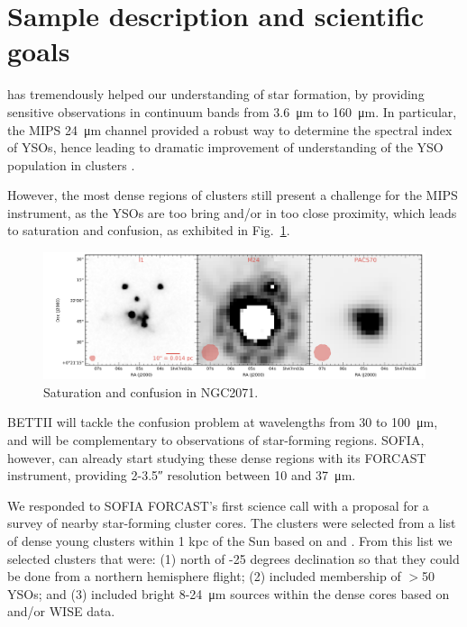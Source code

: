 \section{Sample description and scientific goals}

\Spitzer has tremendously helped our understanding of star formation, by providing sensitive observations in continuum bands from \SI{3.6}{\um} to \SI{160}{\micro\meter}. In particular, the MIPS \SI{24}{\micro\meter} channel provided a robust way to determine the spectral index of YSOs, hence leading to dramatic improvement of understanding of the YSO population in clusters \citep[e.g.,][]{Gutermuth:2009gca,Gutermuth:2011he}.

However, the most dense regions of clusters still present a challenge for the MIPS instrument, as the YSOs are too bring and/or in too close proximity, which leads to saturation and confusion, as exhibited in Fig.~\ref{fig:NGC2071saturated}. 

\begin{figure}[!h]
\begin{center}
\includegraphics[width=\textwidth]{Figures/NGC2071_saturated_mosaic.png}
\vspace{-0.5cm}
\caption[Saturation and confusion]{Saturation and confusion in NGC2071.}
\label{fig:NGC2071saturated}
\end{center}
\end{figure}

BETTII will tackle the confusion problem at wavelengths from 30 to \SI{100}{\micro\meter}, and will be complementary to \Herschel observations of star-forming regions. SOFIA, however, can already start studying these dense regions with its FORCAST instrument, providing 2-\ang{;;3.5} resolution between 10 and \SI{37}{\micro\meter}. 

We responded to SOFIA FORCAST's first science call with a proposal for a survey of nearby star-forming cluster cores. The clusters were selected from a list of dense young clusters within 1 kpc of the Sun based on \citet{Porras:2003kxa} and \citet{Gutermuth:2009gca}. From this list we selected clusters that were: (1) north of -25 degrees declination so that they could be done from a northern hemisphere flight; (2) included membership of $>$50 YSOs; and (3) included bright 8-\SI{24}{\micro\meter} sources within the dense cores based on \Spitzer and/or WISE data. 

